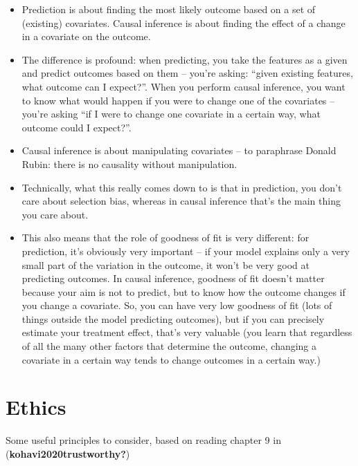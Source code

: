 \documentclass[
  letterpaper,
  DIV=11,
  numbers=noendperiod]{scrreprt}
\begin{document}
\begin{itemize}
\item
  Prediction is about finding the most likely outcome based on a set of
  (existing) covariates. Causal inference is about finding the effect of
  a change in a covariate on the outcome.
\item
  The difference is profound: when predicting, you take the features as
  a given and predict outcomes based on them -- you're asking: ``given
  existing features, what outcome can I expect?''. When you perform
  causal inference, you want to know what would happen if you were to
  change one of the covariates -- you're asking ``if I were to change
  one covariate in a certain way, what outcome could I expect?''.
\item
  Causal inference is about manipulating covariates -- to paraphrase
  Donald Rubin: there is no causality without manipulation.
\item
  Technically, what this really comes down to is that in prediction, you
  don't care about selection bias, whereas in causal inference that's
  the main thing you care about.
\item
  This also means that the role of goodness of fit is very different:
  for prediction, it's obviously very important -- if your model
  explains only a very small part of the variation in the outcome, it
  won't be very good at predicting outcomes. In causal inference,
  goodness of fit doesn't matter because your aim is not to predict, but
  to know how the outcome changes if you change a covariate. So, you can
  have very low goodness of fit (lots of things outside the model
  predicting outcomes), but if you can precisely estimate your treatment
  effect, that's very valuable (you learn that regardless of all the
  many other factors that determine the outcome, changing a covariate in
  a certain way tends to change outcomes in a certain way.)
\end{itemize}


\hypertarget{ethics}{%
\chapter{Ethics}\label{ethics}}

Some useful principles to consider, based on reading chapter 9 in
(\textbf{kohavi2020trustworthy?})
\end{document}
